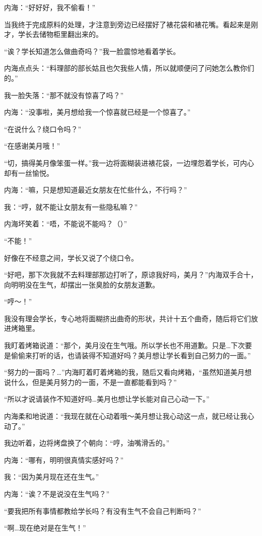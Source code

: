 内海：“好好好，我不偷看！”

当我终于完成原料的处理，才注意到旁边已经摆好了裱花袋和裱花嘴。看起来是刚才，学长去储物柜里翻出来的。

“诶？学长知道怎么做曲奇吗？”我一脸震惊地看着学长。

内海点点头：“料理部的部长姑且也欠我些人情，所以就顺便问了问她怎么教你们的。”

我一脸失落：“那不就没有惊喜了吗？”

内海：“没事啦，美月想给我一个惊喜就已经是一个惊喜了。”

“在说什么？绕口令吗？”

“在感谢美月哦！”

“切，搞得美月像笨蛋一样。”我一边将面糊装进裱花袋，一边埋怨着学长，可内心却有一丝愉悦。

内海：“嘛，只是想知道最近女朋友在忙些什么，不行吗？”

我：“哼，就不能让女朋友有一些隐私嘛？”

内海坏笑着：“唔，不能说不能吗？（）”

“不能！”

好像在不经意之间，学长又说了个绕口令。

“好吧，那下次我就不去料理部那边打听了，原谅我好吗，美月？”内海双手合十，向明明没在生气，却摆出一张臭脸的女朋友道歉。

“哼～！”

我没有理会学长，专心地将面糊挤出曲奇的形状，共计十五个曲奇，随后将它们放进烤箱里。

我盯着烤箱说道：“那个，美月没在生气哦。所以学长也不用道歉。只是…下次要是偷偷来打听的话，也请装得不知道好吗？美月想让学长看到自己努力的一面。”

“努力的一面吗？…”内海盯着盯着烤箱的我，随后又看向烤箱，“虽然知道美月想说什么，但是美月努力的一面，不是一直都能看到吗？”

“所以才说请装作不知道好吗…美月也想让学长能对自己心动一下。”

内海柔和地说道：“我现在就在心动着哦～美月想让我心动这一点，就已经让我心动了。”

我边听着，边将烤盘换了个朝向：“哼，油嘴滑舌的。”

内海：“哪有，明明很真情实感好吗？”

我：“因为美月现在还在生气。”

内海：“诶？不是说没在生气吗？”

“要我把所有事情都教给学长吗？有没有生气不会自己判断吗？”

“啊…现在绝对是在生气！”

